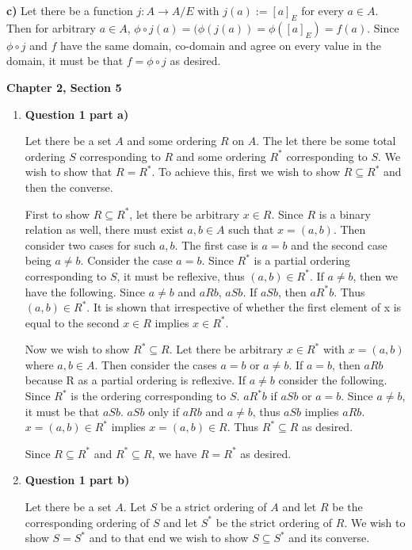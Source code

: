 \documentclass{article}
\begin{document}
\medskip
\textbf{c)}
\medskip
Let there be a function $j: A \xrightarrow{} A/E$ with $j(a) := [a]_{E}$ for every $a \in A$. Then for arbitrary $a \in A$, $\phi \circ j(a) = (\phi(j(a)) = \phi([a]_{E}) = f(a)$. Since $\phi \circ j$ and $f$ have the same domain, co-domain and agree on every value in the domain, it must be that $f = \phi \circ j$ as desired.

\bigskip
\textbf{Chapter 2, Section 5}

\begin{enumerate}
\item \textbf{Question 1 part a)}
\medskip
	
Let there be a set $A$ and some ordering $R$ on $A$. The let there be some total ordering $S$ corresponding to $R$ and some ordering $R^{*}$ corresponding to $S$. We wish to show that $R = R^{*}$. To achieve this, first we wish to show $R \subseteq R^{*}$ and then the converse.

\medskip
First to show $R \subseteq R^{*}$, let there be arbitrary $x \in R$. Since $R$ is a binary relation as well, there must exist $a,b \in A$ such that $x = (a,b)$. Then consider two cases for such $a,b$. The first case is $a = b$ and the second case being $a \neq b$. Consider the case $a = b$. Since $R^{*}$ is a partial ordering corresponding to $S$, it must be reflexive, thus $(a,b) \in R^{*}$. If $a \neq b$, then we have the following. Since $a \neq b$ and $aRb$, $aSb$. If $aSb$, then $aR^{*}b$. Thus $(a,b) \in R^{*}$. It is shown that irrespective of whether the first element of x is equal to the second $x \in R$ implies $x \in R^{*}$.

\medskip
Now we wish to show $R^{*} \subseteq R$. Let there be arbitrary $x \in R^{*}$ with $x = (a,b)$ where $a,b \in A$. Then consider the cases $a = b$ or $a \neq b$. If $a = b$, then $aRb$ because R as a partial ordering is reflexive. If $a \neq b$ consider the following. Since $R^{*}$ is the ordering corresponding to $S$. $aR^{*}b$ if $aSb$ or $a = b$. Since $a \neq b$, it must be that $aSb$. $aSb$ only if $aRb$ and $a \neq b$, thus $aSb$ implies $aRb$. $x = (a,b) \in R^{*}$ implies $x = (a,b) \in R$. Thus $R^{*} \subseteq R$ as desired.

\medskip
Since $R \subseteq R^{*}$ and $R^{*} \subseteq R$, we have $R = R^{*}$ as desired.

\item \textbf{Question 1 part b)}
\medskip

Let there be a set $A$. Let $S$ be a strict ordering of $A$ and let $R$ be the corresponding ordering of $S$ and let $S^{*}$ be the strict ordering of $R$. We wish to show $S = S^{*}$ and to that end we wish to show $S \subseteq S^{*}$ and its converse.


\end{enumerate}
\end{document}
